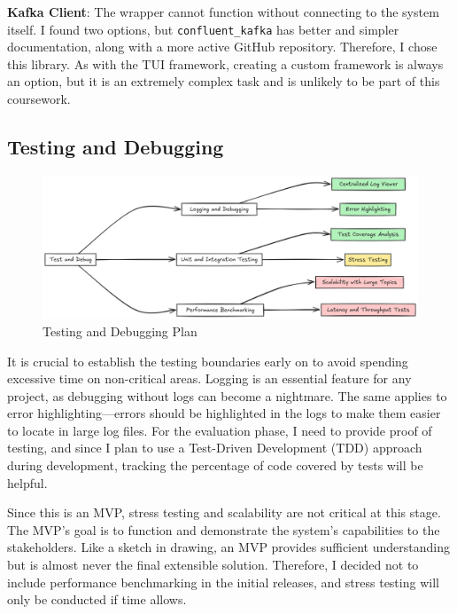 \documentclass[10pt , a4paper]{report}
\begin{document}
\textbf{Kafka Client}: The wrapper cannot function without connecting to the system itself. I found two options, but \texttt{confluent\_kafka} has better and simpler documentation, along with a more active GitHub repository. Therefore, I chose this library. As with the TUI framework, creating a custom framework is always an option, but it is an extremely complex task and is unlikely to be part of this coursework.

\subsection{Testing and Debugging}

\begin{figure}[htbp]
    \centering
    \includegraphics[width=1\linewidth]{imgs/TestDebugDiagram.png}
    \caption{Testing and Debugging Plan}
    \label{fig:test_debug}
\end{figure}

It is crucial to establish the testing boundaries early on to avoid spending excessive time on non-critical areas. Logging is an essential feature for any project, as debugging without logs can become a nightmare. The same applies to error highlighting—errors should be highlighted in the logs to make them easier to locate in large log files. For the evaluation phase, I need to provide proof of testing, and since I plan to use a Test-Driven Development (TDD) approach during development, tracking the percentage of code covered by tests will be helpful.

Since this is an MVP, stress testing and scalability are not critical at this stage. The MVP's goal is to function and demonstrate the system's capabilities to the stakeholders. Like a sketch in drawing, an MVP provides sufficient understanding but is almost never the final extensible solution. Therefore, I decided not to include performance benchmarking in the initial releases, and stress testing will only be conducted if time allows.
\end{document}
